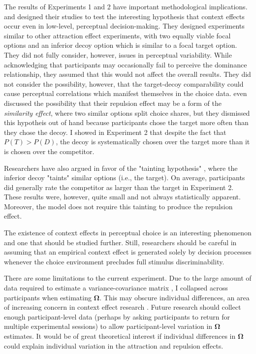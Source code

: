 The results of Experiments 1 and 2 have important methodological implications. \textcite{trueblood2013not} and \textcite{spektorWhenGoodLooks2018b} designed their studies to test the interesting hypothesis that context effects occur even in low-level, perceptual decision-making. They designed experiments similar to other attraction effect experiments, with two equally viable focal options and an inferior decoy option which is similar to a focal target option. They did not fully consider, however, issues in perceptual variability. While acknowledging that participants may occasionally fail to perceive the dominance relationship, they assumed that this would not affect the overall results. They did not consider the possibility, however, that the target-decoy comparability could cause perceptual correlations which manifest themselves in the choice data. \textcite{spektorWhenGoodLooks2018b} even discussed the possibility that their repulsion effect may be a form of the \textit{similarity effect}, where two similar options split choice shares, but they dismissed this hypotheis out of hand because participants chose the target more often than they chose the decoy. I showed in Experiment 2 that despite the fact that $P(T)>P(D)$, the decoy is systematically chosen over the target more than it is chosen over the competitor. 

Researchers have also argued in favor of the "tainting hypothesis" \parencite{simonson2014vices,spektorWhenGoodLooks2018b}, where the inferior decoy "taints" similar options (i.e., the target). On average, participants did generally rate the competitor as larger than the target in Experiment 2. These results were, however, quite small and not always statistically apparent. Moreover, the model does not require this tainting to produce the repulsion effect.

The existence of context effects in perceptual choice is an interesting phenomenon and one that should be studied further. Still, researchers should be careful in assuming that an empirical context effect is generated solely by decision processes whenever the choice environment precludes full stimulus discriminability.

There are some limitations to the current experiment. Due to the large amount of data required to estimate a variance-covariance matrix \parencite{martin2021,merkle2023opaque}, I collapsed across participants when estimating $\boldsymbol{\Omega}$. This may obscure individual differences, an area of increasing concern in context effect research \parencite{liewAppropriacyAveragingStudy2016b,trueblood2015fragile,davis2023illustrated}. Future research should collect enough participant-level data (perhaps by asking participants to return for multiple experimental sessions) to allow participant-level variation in $\boldsymbol{\Omega}$ estimates. It would be of great theoretical interest if individual differences in $\boldsymbol{\Omega}$ could explain individual variation in the attraction and repulsion effects.

